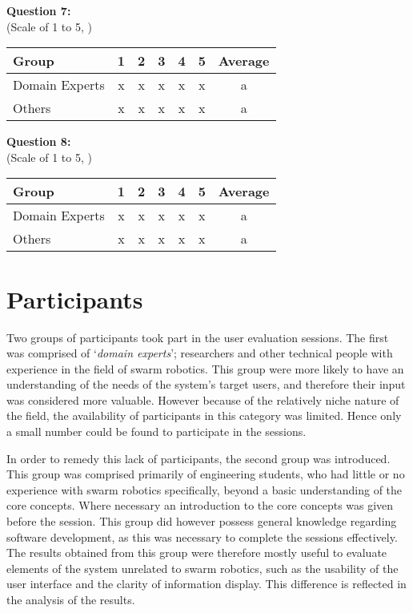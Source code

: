 \noindent\textbf{Question 7: }\\(Scale of 1 to 5, )

\begin{center}
\begin{tabular}{ l c c c c c c }
 Group & 1 & 2 & 3 & 4 & 5 & Average \\ 
 \hline
 Domain Experts & x & x & x & x & x & a \\
 Others 		& x & x & x & x & x & a \\
\end{tabular}
\end{center}

\noindent\textbf{Question 8: }\\(Scale of 1 to 5, )

\begin{center}
\begin{tabular}{ l c c c c c c }
 Group & 1 & 2 & 3 & 4 & 5 & Average \\ 
 \hline
 Domain Experts & x & x & x & x & x & a \\
 Others 		& x & x & x & x & x & a \\
\end{tabular}
\end{center}


\section{Participants}

Two groups of participants took part in the user evaluation sessions. The first was comprised of `\textit{domain experts}'; researchers and other technical people with experience in the field of swarm robotics. This group were more likely to have an understanding of the needs of the system's target users, and therefore their input was considered more valuable. However because of the relatively niche nature of the field, the availability of participants in this category was limited. Hence only a small number could be found to participate in the sessions.

In order to remedy this lack of participants, the second group was introduced. This group was comprised primarily of engineering students, who had little or no experience with swarm robotics specifically, beyond a basic understanding of the core concepts. Where necessary an introduction to the core concepts was given before the session. This group did however possess general knowledge regarding software development, as this was necessary to complete the sessions effectively. The results obtained from this group were therefore mostly useful to evaluate elements of the system unrelated to swarm robotics, such as the usability of the user interface and the clarity of information display. This difference is reflected in the analysis of the results.

